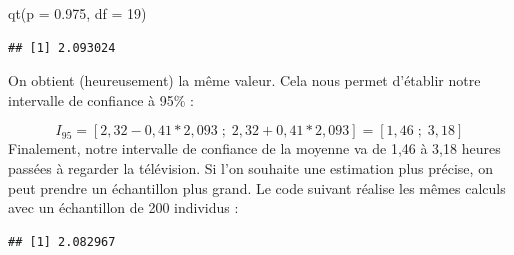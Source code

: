 \documentclass[
]{book}
\newenvironment{Shaded}{\begin{snugshade}}{\end{snugshade}}
\newcommand{\AttributeTok}[1]{\textcolor[rgb]{0.77,0.63,0.00}{#1}}
\newcommand{\CommentTok}[1]{\textcolor[rgb]{0.56,0.35,0.01}{\textit{#1}}}
\newcommand{\DecValTok}[1]{\textcolor[rgb]{0.00,0.00,0.81}{#1}}
\newcommand{\FloatTok}[1]{\textcolor[rgb]{0.00,0.00,0.81}{#1}}
\newcommand{\FunctionTok}[1]{\textcolor[rgb]{0.00,0.00,0.00}{#1}}
\newcommand{\NormalTok}[1]{#1}
\newcommand{\OtherTok}[1]{\textcolor[rgb]{0.56,0.35,0.01}{#1}}
\newcommand{\SpecialCharTok}[1]{\textcolor[rgb]{0.00,0.00,0.00}{#1}}
\begin{document}
\begin{Shaded}
\begin{Highlighting}[]
\FunctionTok{qt}\NormalTok{(}\AttributeTok{p =} \FloatTok{0.975}\NormalTok{, }\AttributeTok{df =} \DecValTok{19}\NormalTok{)}
\end{Highlighting}
\end{Shaded}

\begin{verbatim}
## [1] 2.093024
\end{verbatim}

On obtient (heureusement) la même valeur. Cela nous permet d'établir notre intervalle de confiance à 95\% :

\[ I_{95} = [2,32-0,41*2,093 \;;\;  2,32 + 0,41*2,093] = [1,46 \;;\; 3,18] \]
Finalement, notre intervalle de confiance de la moyenne va de 1,46 à 3,18 heures passées à regarder la télévision. Si l'on souhaite une estimation plus précise, on peut prendre un échantillon plus grand. Le code suivant réalise les mêmes calculs avec un échantillon de 200 individus :

\begin{Shaded}
\end{Shaded}

\begin{verbatim}
## [1] 2.082967
\end{verbatim}

\begin{Shaded}
\end{Shaded}
\end{document}
